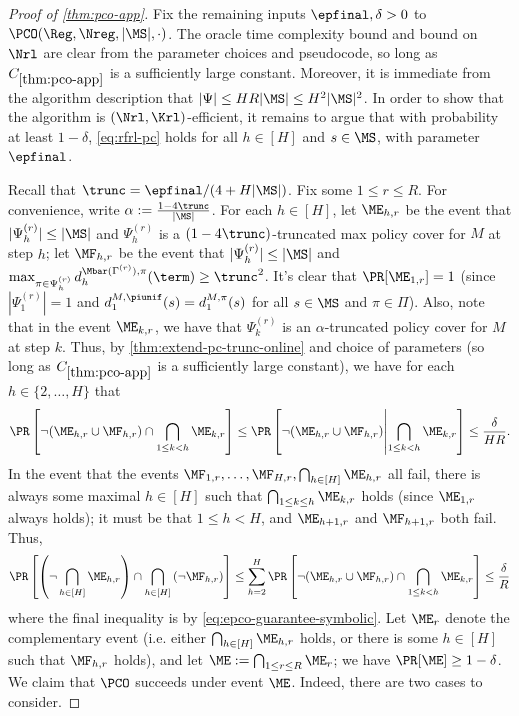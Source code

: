 \begin{proof}[Proof of \cref{thm:pco-app}]
Fix the remaining inputs $\epfinal,\delta>0$ to $\PCO(\Reg,\Nreg,|\MS|,\cdot)$. The oracle time complexity bound and bound on $\Nrl$ are clear from the parameter choices and pseudocode, so long as $C_{\ref{thm:pco-app}}$ is a sufficiently large constant. Moreover, it is immediate from the algorithm description that $|\Psi| \leq HR|\MS| \leq H^2|\MS|^2$. In order to show that the algorithm is $(\Nrl,\Krl)$-efficient, it remains to argue that with probability at least $1-\delta$, \cref{eq:rfrl-pc} holds for all $h \in [H]$ and $s \in \MS$, with parameter $\epfinal$.

Recall that $\trunc = \epfinal/(4+H|\MS|)$. Fix some $1 \leq r \leq R$. For convenience, write $\alpha := \frac{1-4\trunc}{|\MS|}$. For each $h \in [H]$, let $\ME_{h,r}$ be the event that $|\Psi_h^{(r)}| \leq |\MS|$ and $\Psi_h^{(r)}$ is a $(1-4\trunc)$-truncated max policy cover for $M$ at step $h$; let $\MF_{h,r}$ be the event that $|\Psi_{h}^{(r)}| \leq |\MS|$ and $\max_{\pi\in\Psi_{h}^{(r)}} d^{\Mbar(\Gamma^{(r)}),\pi}_{h}(\term) \geq \trunc^2$. It's clear that $\Pr[\ME_{1,r}] = 1$ (since $|\Psi_1^{(r)}| = 1$ and $d^{M,\piunif}_1(s) = d^{M,\pi}_1(s)$ for all $s\in\MS$ and $\pi \in \Pi$). Also, note that in the event $\ME_{k,r}$, we have that $\Psi_k^{(r)}$ is an $\alpha$-truncated policy cover for $M$ at step $k$. Thus, by \cref{thm:extend-pc-trunc-online} and choice of parameters (so long as $C_{\ref{thm:pco-app}}$ is a sufficiently large constant), we have for each $h \in \{2,\dots,H\}$ that
\begin{equation} \Pr\left[\lnot (\ME_{h,r} \cup \MF_{h,r}) \cap \bigcap_{1 \leq k < h} \ME_{k,r}\right] \leq \Pr\left[\lnot (\ME_{h,r} \cup \MF_{h,r}) \middle | \bigcap_{1 \leq k < h} \ME_{k,r}\right] \leq \frac{\delta}{HR}.\label{eq:epco-guarantee-symbolic}\end{equation}
In the event that the events $\MF_{1,r},\dots,\MF_{H,r}, \bigcap_{h\in[H]} \ME_{h,r}$ all fail, there is always some maximal $h \in [H]$ such that $\bigcap_{1 \leq k \leq h} \ME_{k,r}$ holds (since $\ME_{1,r}$ always holds); it must be that $1 \leq h<H$, and $\ME_{h+1,r}$ and $\MF_{h+1,r}$ both fail. Thus,
\[\Pr\left[\left(\lnot \bigcap_{h \in [H]} \ME_{h,r}\right) \cap \bigcap_{h \in [H]} \left(\lnot \MF_{h,r}\right)\right] \leq \sum_{h=2}^H \Pr\left[\lnot (\ME_{h,r} \cup \MF_{h,r}) \cap \bigcap_{1 \leq k < h} \ME_{k,r}\right] \leq \frac{\delta}{R}\]
where the final inequality is by \cref{eq:epco-guarantee-symbolic}. Let $\ME_r$ denote the complementary event (i.e. either $\bigcap_{h \in [H]} \ME_{h,r}$ holds, or there is some $h \in [H]$ such that $\MF_{h,r}$ holds), and let $\ME := \bigcap_{1 \leq r \leq R} \ME_r$; we have $\Pr[\ME] \geq 1-\delta$. We claim that $\PCO$ succeeds under event $\ME$. Indeed, there are two cases to consider.


\end{proof}
